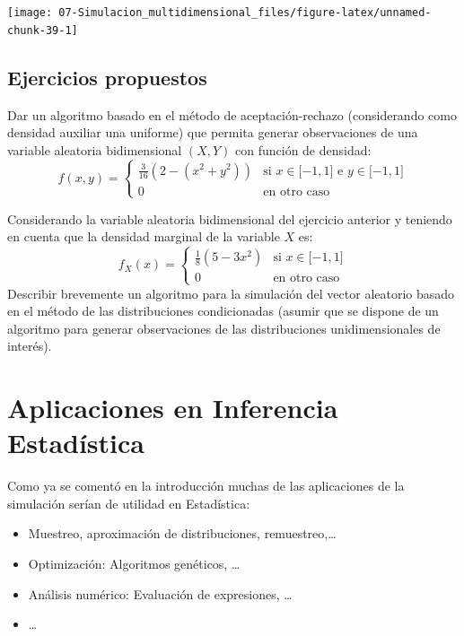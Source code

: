 \documentclass[
]{book}
\theoremstyle{break}
\theoremstyle{definition}
\theoremstyle{definition}
\theoremstyle{definition}
\theoremstyle{remark}
\let\BeginKnitrBlock\begin \let\EndKnitrBlock\end
\begin{document}
\begin{center}\texttt{[image: 07-Simulacion\_multidimensional\_files/figure-latex/unnamed-chunk-39-1]} \end{center}

\hypertarget{ejercicios-propuestos}{%
\section{Ejercicios propuestos}\label{ejercicios-propuestos}}

\BeginKnitrBlock{exercise}
\protect\hypertarget{exr:ar2d}{}{\label{exr:ar2d} }
\EndKnitrBlock{exercise}

Dar un algoritmo basado en el método de aceptación-rechazo
(considerando como densidad auxiliar una uniforme) que permita
generar observaciones de una variable aleatoria bidimensional
\(\left( X,Y\right)\) con función de densidad:
\[f(x,y)=\left\{ 
\begin{array}{cl}
\frac{3}{16}\left( 2-\left( x^2+y^2\right) \right)  & \text{si }x\in
\lbrack -1,1]\text{ e }y\in \lbrack -1,1] \\ 
0 & \text{en otro caso}
\end{array}
\right.\]

\BeginKnitrBlock{exercise}
\protect\hypertarget{exr:cond2d}{}{\label{exr:cond2d} }
\EndKnitrBlock{exercise}

Considerando la variable aleatoria bidimensional del ejercicio
anterior y teniendo en cuenta que la densidad marginal de la
variable \(X\) es:
\[f_{X}(x)=\left\{ 
\begin{array}{cl}
\frac{1}{8}\left( 5-3x^2\right)  & \text{si }x\in \lbrack -1,1] \\ 
0 & \text{en otro caso}
\end{array}
\right.\]
Describir brevemente un algoritmo para la simulación del
vector aleatorio basado en el método de las distribuciones
condicionadas (asumir que se dispone de un algoritmo para generar
observaciones de las distribuciones unidimensionales de interés).

\hypertarget{cap8}{%
\chapter{Aplicaciones en Inferencia Estadística}\label{cap8}}

Como ya se comentó en la introducción muchas de las aplicaciones de la simulación serían de utilidad en Estadística:

\begin{itemize}
\item
  Muestreo, aproximación de distribuciones,
  remuestreo,\ldots{}
\item
  Optimización: Algoritmos genéticos, \ldots{}
\item
  Análisis numérico: Evaluación de expresiones, \ldots{}
\item
  \ldots{}
\end{itemize}
\end{document}
